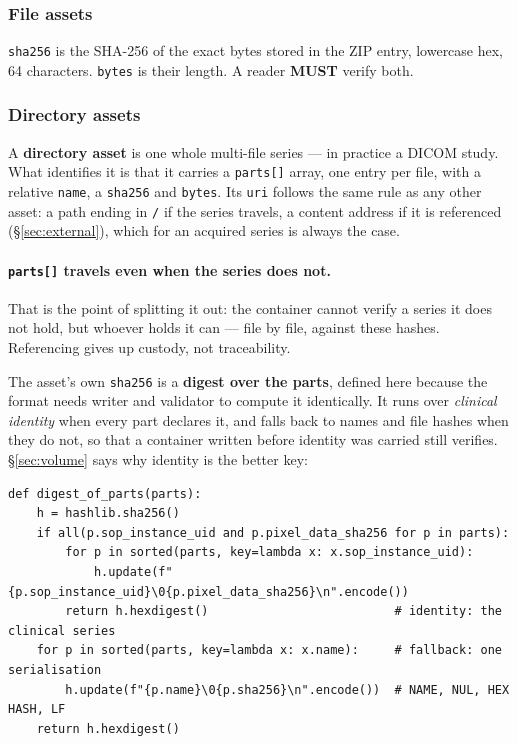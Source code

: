 \documentclass[11pt,a4paper]{article}
\newcommand{\MUST}{\textcolor{uosred}{\textbf{MUST}}}
\newcommand{\code}[1]{\texttt{\small #1}}
\begin{document}
\subsubsection{File assets}
\code{sha256} is the SHA-256 of the exact bytes stored in the ZIP entry, lowercase hex,
64 characters. \code{bytes} is their length. A reader \MUST{} verify both.

\subsubsection{Directory assets}\label{sec:dirasset}
A \textbf{directory asset} is one whole multi-file series --- in practice a DICOM study.
What identifies it is that it carries a \code{parts[]} array, one entry per file, with a
relative \code{name}, a \code{sha256} and \code{bytes}. Its \code{uri} follows the same
rule as any other asset: a path ending in \code{/} if the series travels, a content address
if it is referenced (\S\ref{sec:external}), which for an acquired series is always the case.

\paragraph{\code{parts[]} travels even when the series does not.} That is the point of
splitting it out: the container cannot verify a series it does not hold, but whoever holds
it can --- file by file, against these hashes. Referencing gives up custody, not
traceability.

\vspace{6px}
The asset's own \code{sha256} is a \textbf{digest over the parts}, defined here because
the format needs writer and validator to compute it identically. It runs over
\emph{clinical identity} when every part declares it, and falls back to names and file
hashes when they do not, so that a container written before identity was carried still
verifies. \S\ref{sec:volume} says why identity is the better key:

\begin{lstlisting}[style=py]
def digest_of_parts(parts):
    h = hashlib.sha256()
    if all(p.sop_instance_uid and p.pixel_data_sha256 for p in parts):
        for p in sorted(parts, key=lambda x: x.sop_instance_uid):
            h.update(f"{p.sop_instance_uid}\0{p.pixel_data_sha256}\n".encode())
        return h.hexdigest()                          # identity: the clinical series
    for p in sorted(parts, key=lambda x: x.name):     # fallback: one serialisation
        h.update(f"{p.name}\0{p.sha256}\n".encode())  # NAME, NUL, HEX HASH, LF
    return h.hexdigest()
\end{lstlisting}
\end{document}
